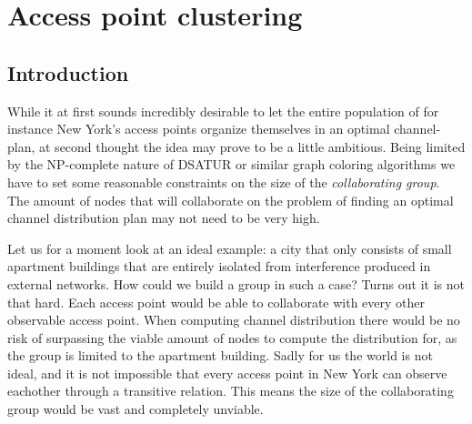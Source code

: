 \chapter{Access point clustering} \label{chap:clustering}



\section{Introduction}
While it at first sounds incredibly desirable to let the entire population of for instance New York's access points organize themselves in an optimal channel-plan,
at second thought the idea may prove to be a little ambitious. Being limited by the NP-complete nature of DSATUR or similar graph coloring algorithms
we have to set some reasonable constraints on the size of the \textit{collaborating group}. The amount of nodes that will collaborate on the problem of finding an optimal channel distribution
plan may not need to be very high.

Let us for a moment look at an ideal example: a city that only consists of small apartment buildings that are entirely isolated from interference produced in external networks.
How could we build a group in such a case? Turns out it is not that hard. Each access point would be able to collaborate with every other observable access point.
When computing channel distribution there would be no risk of surpassing the viable amount of nodes to compute the distribution for, as the group is limited to the apartment building. Sadly for us the world is not ideal,
and it is not impossible that every access point in New York can observe eachother through a transitive relation. This means the size of
the collaborating group would be vast and completely unviable.  

